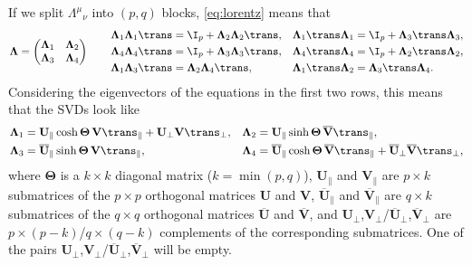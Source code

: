 \documentclass[11pt]{article}
\newcommand{\U}{\mathbf{U}}
\newcommand{\V}{\mathbf{V}}
\newcommand{\Ub}{\overline{\U}}
\newcommand{\Vb}{\overline{\V}}
\newcommand{\Lambdab}{\boldsymbol{\Lambda}}
\newcommand{\Thetab}{\boldsymbol{\Theta}}
\begin{document}
If we split \(\Lambda^\mu{}_\nu\) into \((p,q)\) blocks, \cref{eq:lorentz} means that
%
\begin{equation*}
  \Lambdab = 
    \begin{pmatrix}
      \Lambdab_1 & \Lambdab_2 \\
      \Lambdab_3 & \Lambdab_4
    \end{pmatrix}
  \qquad
\begin{aligned}
  \Lambdab_1 \Lambdab_1\trans &= \I_p + \Lambdab_2 \Lambdab_2\trans, &
  \Lambdab_1\trans \Lambdab_1 &= \I_p + \Lambdab_3\trans \Lambdab_3, \\
  \Lambdab_4 \Lambdab_4\trans &= \I_p + \Lambdab_3 \Lambdab_3\trans, &
  \Lambdab_4\trans \Lambdab_4 &= \I_p + \Lambdab_2\trans \Lambdab_2, \\
  \Lambdab_1 \Lambdab_3\trans &= \Lambdab_2 \Lambdab_4\trans, &
  \Lambdab_1\trans \Lambdab_2 &= \Lambdab_3\trans \Lambdab_4.
\end{aligned}
\end{equation*}
%
Considering the eigenvectors of the equations in the first two rows, this means that the SVDs look like
%
\begin{equation*}
\begin{aligned}
  \Lambdab_1  &= \U_\parallel \cosh \Thetab\, \V\trans_\parallel 
              +  \U_\perp \V\trans_\perp, &
  \Lambdab_2  &= \U_\parallel \sinh \Thetab\, \Vb\trans_\parallel, \\
  \Lambdab_3  &= \Ub_\parallel \sinh \Thetab\, \V\trans_\parallel, &
  \Lambdab_4  &= \Ub_\parallel \cosh \Thetab\, \Vb\trans_\parallel 
              +  \Ub_\perp \Vb\trans_\perp,
\end{aligned}
\end{equation*}
%
where \(\Thetab\) is a \(k \times k\) diagonal matrix (\(k = \min(p,q)\)), 
\(\U_\parallel\) and \(\V_\parallel\) are \(p \times k\) submatrices of the \(p \times p\) orthogonal matrices \(\U\) and \(\V\), 
\(\Ub_\parallel\) and \(\Vb_\parallel\) are \(q \times k\) submatrices of the \(q \times q\) orthogonal matrices \(\Ub\) and \(\Vb\), 
and \(\U_\perp\),\(\V_\perp\)/\(\Ub_\perp\),\(\Vb_\perp\) are \(p \times (p-k)\)/\(q \times (q-k)\)  complements of the corresponding submatrices.
One of the pairs \(\U_\perp\),\(\V_\perp\)/\(\Ub_\perp\),\(\Vb_\perp\) will be empty.
\end{document}
